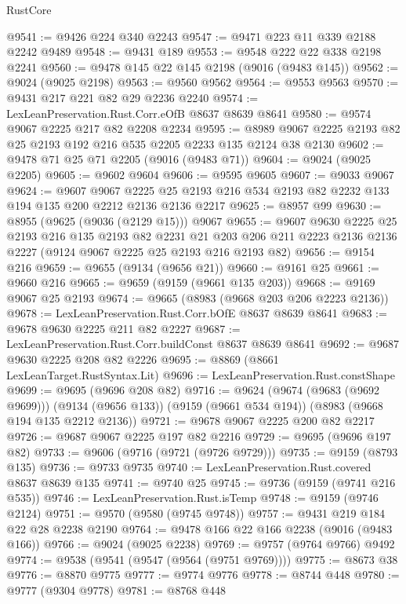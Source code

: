 \begin{lexlean}{RustCore}
\begin{coremodule}
@9541 := @9426 @224 @340 @2243
@9547 := @9471 @223 @11 @339 @2188 @2242 @9489
@9548 := @9431 @189
@9553 := @9548 @222 @22 @338 @2198 @2241
@9560 := @9478 @145 @22 @145 @2198 (@9016 (@9483 @145))
@9562 := @9024 (@9025 @2198)
@9563 := @9560 @9562
@9564 := @9553 @9563
@9570 := @9431 @217 @221 @82 @29 @2236 @2240
@9574 := LexLeanPreservation.Rust.Corr.eOfB @8637 @8639 @8641
@9580 := @9574 @9067 @2225 @217 @82 @2208 @2234
@9595 := @8989 @9067 @2225 @2193 @82 @25 @2193 @192 @216 @535 @2205 @2233 @135 @2124 @38 @2130
@9602 := @9478 @71 @25 @71 @2205 (@9016 (@9483 @71))
@9604 := @9024 (@9025 @2205)
@9605 := @9602 @9604
@9606 := @9595 @9605
@9607 := @9033 @9067
@9624 := @9607
    @9067
    @2225
    @25
    @2193
    @216
    @534
    @2193
    @82
    @2232
    @133
    @194
    @135
    @200
    @2212
    @2136
    @2136
    @2217
@9625 := @8957 @99
@9630 := @8955 (@9625 (@9036 (@2129 @15))) @9067
@9655 := @9607
    @9630
    @2225
    @25
    @2193
    @216
    @135
    @2193
    @82
    @2231
    @21
    @203
    @206
    @211
    @2223
    @2136
    @2136
    @2227
    (@9124 @9067 @2225 @25 @2193 @216 @2193 @82)
@9656 := @9154 @216
@9659 := @9655 (@9134 (@9656 @21))
@9660 := @9161 @25
@9661 := @9660 @216
@9665 := @9659 (@9159 (@9661 @135 @203))
@9668 := @9169 @9067 @25 @2193
@9674 := @9665 (@8983 (@9668 @203 @206 @2223 @2136))
@9678 := LexLeanPreservation.Rust.Corr.bOfE @8637 @8639 @8641
@9683 := @9678 @9630 @2225 @211 @82 @2227
@9687 := LexLeanPreservation.Rust.Corr.buildConst @8637 @8639 @8641
@9692 := @9687 @9630 @2225 @208 @82 @2226
@9695 := @8869 (@8661 LexLeanTarget.RustSyntax.Lit)
@9696 := LexLeanPreservation.Rust.constShape
@9699 := @9695 (@9696 @208 @82)
@9716 := @9624
    (@9674 (@9683 (@9692 @9699)))
    (@9134 (@9656 @133))
    (@9159 (@9661 @534 @194))
    (@8983 (@9668 @194 @135 @2212 @2136))
@9721 := @9678 @9067 @2225 @200 @82 @2217
@9726 := @9687 @9067 @2225 @197 @82 @2216
@9729 := @9695 (@9696 @197 @82)
@9733 := @9606 (@9716 (@9721 (@9726 @9729)))
@9735 := @9159 (@8793 @135)
@9736 := @9733 @9735
@9740 := LexLeanPreservation.Rust.covered @8637 @8639 @135
@9741 := @9740 @25
@9745 := @9736 (@9159 (@9741 @216 @535))
@9746 := LexLeanPreservation.Rust.isTemp
@9748 := @9159 (@9746 @2124)
@9751 := @9570 (@9580 (@9745 @9748))
@9757 := @9431 @219 @184 @22 @28 @2238 @2190
@9764 := @9478 @166 @22 @166 @2238 (@9016 (@9483 @166))
@9766 := @9024 (@9025 @2238)
@9769 := @9757 (@9764 @9766) @9492
@9774 := @9538 (@9541 (@9547 (@9564 (@9751 @9769))))
@9775 := @8673 @38
@9776 := @8870 @9775
@9777 := @9774 @9776
@9778 := @8744 @448
@9780 := @9777 (@9304 @9778)
@9781 := @8768 @448

\end{coremodule}
\end{lexlean}
